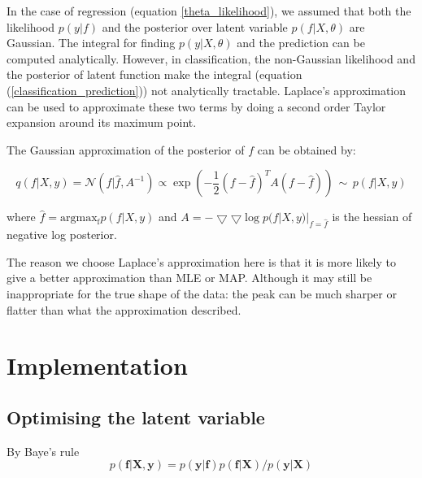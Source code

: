 \documentclass[14pt]{report}
\numberwithin{equation}{chapter}
\begin{document}
\begin{spacing}{2}
In the case of regression (equation \ref{theta_likelihood}), we assumed that both the likelihood $p(y|f)$ and the posterior over latent variable $p(f|X,\theta)$ are Gaussian. The integral for finding $p(y|X,\theta)$ and the prediction can be computed analytically. However, in classification, the non-Gaussian likelihood and the posterior of latent function make the integral (equation (\ref{classification_prediction})) not analytically tractable. Laplace's approximation can be used to approximate these two terms by doing a second order Taylor 		expansion around its maximum point. 

The Gaussian approximation of the posterior of $f$ can be obtained by:


\begin{equation}\label{LaplaceApp}
q(f|X,y) = \mathcal{N}(f|\hat{f},A^{-1}) \propto \operatorname{exp}(-\frac{1}{2}(f-\hat{f})^T A(f-\hat{f})) \,\sim\, p(f|X,y)
\end{equation}

where $\hat{f} = \operatorname{argmax_f} p(f|X,y)$ and $A = -\bigtriangledown\bigtriangledown \operatorname{log}p(f|X,y)|_{f=\hat{f}}$ is the hessian of negative log posterior.


The reason we choose Laplace's approximation here is that it is more likely to give a better approximation than MLE or MAP\cite{azevedo1994laplace}. Although it may still be inappropriate for the true shape of the data: the peak can be much sharper or flatter than what the approximation described. 



\section{Implementation}

\subsection{Optimising the latent variable}
By Baye's rule
\[
p(\boldsymbol f|\boldsymbol X,\boldsymbol y) = {p(\boldsymbol y|\boldsymbol f)p(\boldsymbol f|\boldsymbol X)}/{p(\boldsymbol y|\boldsymbol X)} 
\]


\end{spacing}
\end{document}

